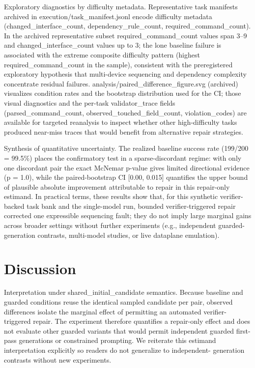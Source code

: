 \documentclass[conference]{IEEEtran}
\begin{document}
Exploratory diagnostics by difficulty metadata. Representative task manifests archived in execution/task\_manifest.jsonl encode difficulty metadata (changed\_interface\_count, dependency\_rule\_count, required\_command\_count). In the archived representative subset required\_command\_count values span 3--9 and changed\_interface\_count values up to 3; the lone baseline failure is associated with the extreme composite difficulty pattern (highest required\_command\_count in the sample), consistent with the preregistered exploratory hypothesis that multi-device sequencing and dependency complexity concentrate residual failures. analysis/paired\_difference\_figure.svg (archived) visualizes condition rates and the bootstrap distribution used for the CI; those visual diagnostics and the per-task validator\_trace fields (parsed\_command\_count, observed\_touched\_field\_count, violation\_codes) are available for targeted reanalysis to inspect whether other high-difficulty tasks produced near-miss traces that would benefit from alternative repair strategies.

Synthesis of quantitative uncertainty. The realized baseline success rate (199/200 = 99.5\%) places the confirmatory test in a sparse-discordant regime: with only one discordant pair the exact McNemar p-value gives limited directional evidence (p = 1.0), while the paired-bootstrap CI [0.00, 0.015] quantifies the upper bound of plausible absolute improvement attributable to repair in this repair-only estimand. In practical terms, these results show that, for this synthetic verifier-backed task bank and the single-model run, bounded verifier-triggered repair corrected one expressible sequencing fault; they do not imply large marginal gains across broader settings without further experiments (e.g., independent guarded-generation contrasts, multi-model studies, or live dataplane emulation).

\section{Discussion}
Interpretation under shared\_initial\_candidate semantics. Because baseline and guarded conditions reuse the identical sampled candidate per pair, observed differences isolate the marginal effect of permitting an automated verifier-triggered repair. The experiment therefore quantifies a repair-only effect and does not evaluate other guarded variants that would permit independent guarded first-pass generations or constrained prompting. We reiterate this estimand interpretation explicitly so readers do not generalize to independent- generation contrasts without new experiments.
\end{document}
